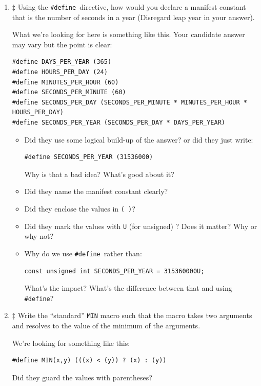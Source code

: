\documentclass[12pt]{article}
\newcommand{\cdefine}{{\texttt{\#define}}}%
\begin{document}
\begin{enumerate}

\item $\ddagger$ Using the \cdefine\ directive, how would you declare a manifest
constant that is the number of seconds in a year (Disregard leap year in your
answer).
\par
What we're looking for here is something like this. Your candidate answer may
vary but the point is clear:
\par
\begin{lstlisting}
#define DAYS_PER_YEAR (365)
#define HOURS_PER_DAY (24)
#define MINUTES_PER_HOUR (60)
#define SECONDS_PER_MINUTE (60)
#define SECONDS_PER_DAY (SECONDS_PER_MINUTE * MINUTES_PER_HOUR * HOURS_PER_DAY)
#define SECONDS_PER_YEAR (SECONDS_PER_DAY * DAYS_PER_YEAR)
\end{lstlisting}

\begin{itemize}
\item Did they use some logical build-up of the answer? or did they just write:
\begin{lstlisting}
#define SECONDS_PER_YEAR (31536000)
\end{lstlisting}
Why is that a bad idea?  What's good about it? 
\item Did they name the manifest constant clearly?
\item Did they enclose the values in {\texttt{( )}}?
\item Did they mark the values with {\texttt{U}} (for unsigned) ?  Does it matter? Why or why not?
\item Why do we use \cdefine\  rather than:
\begin{lstlisting}
const unsigned int SECONDS_PER_YEAR = 315360000U;
\end{lstlisting}
What's the impact? What's the difference between that and using \cdefine?
\end{itemize}

\item $\ddagger$ Write the ``standard'' {\texttt{MIN}} macro such that the macro takes two arguments
and resolves to the value of the minimum of the arguments.
\par
We're looking for something like this:
\par
\begin{lstlisting}
#define MIN(x,y) (((x) < (y)) ? (x) : (y))
\end{lstlisting}
\par
Did they guard the values with parentheses?


\end{enumerate}
\end{document}
